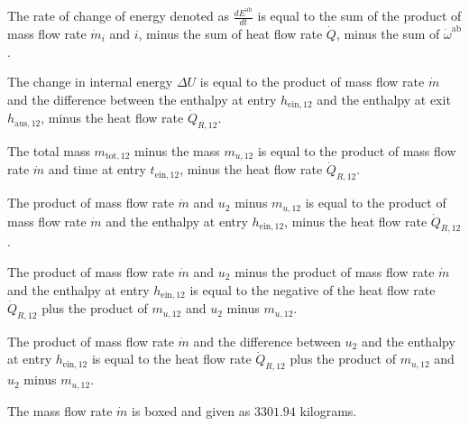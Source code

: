 The rate of change of energy denoted as \( \frac{dE^{\text{ab}}}{dt} \) is equal to the sum of the product of mass flow rate \( \dot{m}_i \) and \( i \), minus the sum of heat flow rate \( \dot{Q} \), minus the sum of \( \dot{\omega}^{\text{ab}} \).

The change in internal energy \( \Delta U \) is equal to the product of mass flow rate \( \dot{m} \) and the difference between the enthalpy at entry \( h_{\text{ein},12} \) and the enthalpy at exit \( h_{\text{aus},12} \), minus the heat flow rate \( \dot{Q}_{R,12} \).

The total mass \( m_{\text{tot},12} \) minus the mass \( m_{u,12} \) is equal to the product of mass flow rate \( \dot{m} \) and time at entry \( t_{\text{ein},12} \), minus the heat flow rate \( \dot{Q}_{R,12} \).

The product of mass flow rate \( \dot{m} \) and \( u_2 \) minus \( m_{u,12} \) is equal to the product of mass flow rate \( \dot{m} \) and the enthalpy at entry \( h_{\text{ein},12} \), minus the heat flow rate \( \dot{Q}_{R,12} \).

The product of mass flow rate \( \dot{m} \) and \( u_2 \) minus the product of mass flow rate \( \dot{m} \) and the enthalpy at entry \( h_{\text{ein},12} \) is equal to the negative of the heat flow rate \( \dot{Q}_{R,12} \) plus the product of \( m_{u,12} \) and \( u_2 \) minus \( m_{u,12} \).

The product of mass flow rate \( \dot{m} \) and the difference between \( u_2 \) and the enthalpy at entry \( h_{\text{ein},12} \) is equal to the heat flow rate \( \dot{Q}_{R,12} \) plus the product of \( m_{u,12} \) and \( u_2 \) minus \( m_{u,12} \).

The mass flow rate \( \dot{m} \) is boxed and given as \( 3301.94 \) kilograms.